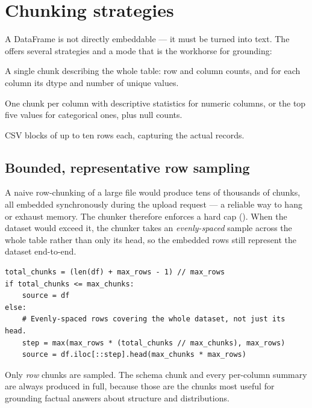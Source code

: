 \section{Chunking strategies}
A DataFrame is not directly embeddable --- it must be turned into text. The
 offers several strategies and a  mode that is
the workhorse for grounding:

\begin{description}[style=nextline,leftmargin=0pt]
  \item[\textcolor{uaIndigoD}{Schema chunk}] A single chunk describing the whole
    table: row and column counts, and for each column its dtype and number of
    unique values.
  \item[\textcolor{uaIndigoD}{Per-column summary chunks}] One chunk per column
    with descriptive statistics for numeric columns, or the top five values for
    categorical ones, plus null counts.
  \item[\textcolor{uaIndigoD}{Row chunks}] CSV blocks of up to ten rows each,
    capturing the actual records.
\end{description}

\subsection{Bounded, representative row sampling}
A naive row-chunking of a large file would produce tens of thousands of chunks,
all embedded synchronously during the upload request --- a reliable way to hang
or exhaust memory. The chunker therefore enforces a hard cap
(). When the dataset would exceed it, the chunker
takes an \emph{evenly-spaced} sample across the whole table rather than only its
head, so the embedded rows still represent the dataset end-to-end.

\begin{lstlisting}[style=py,caption={Bounded, evenly-spaced row sampling.}]
total_chunks = (len(df) + max_rows - 1) // max_rows
if total_chunks <= max_chunks:
    source = df
else:
    # Evenly-spaced rows covering the whole dataset, not just its head.
    step = max(max_rows * (total_chunks // max_chunks), max_rows)
    source = df.iloc[::step].head(max_chunks * max_rows)
\end{lstlisting}

\begin{uanote}
Only \emph{row} chunks are sampled. The schema chunk and every per-column
summary are always produced in full, because those are the chunks most useful
for grounding factual answers about structure and distributions.
\end{uanote}

